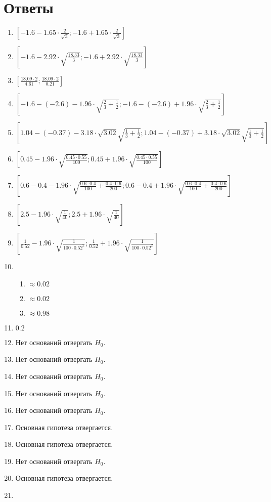 \documentclass[12pt]{article}
\begin{document}
\section{Ответы}


\begin{enumerate}
\item $\left[-1.6 - 1.65 \cdot \frac{2}{\sqrt{3}}; -1.6 + 1.65 \cdot \frac{2}{\sqrt{3}} \right]$
\item $\left[-1.6 - 2.92 \cdot \sqrt{\frac{18.33}{3}}; -1.6 + 2.92 \cdot \sqrt{\frac{18.33}{3}} \right]$
\item $\left[\frac{18.09 \cdot 2}{4.61}; \frac{18.09 \cdot 2}{0.21} \right]$
\item $\left[-1.6 - (-2.6) - 1.96 \cdot \sqrt{\frac{2}{3} + \frac{1}{2}}; -1.6 - (-2.6) + 1.96 \cdot \sqrt{\frac{2}{3} + \frac{1}{2}} \right]$
\item $\left[1.04 - (-0.37) - 3.18 \cdot \sqrt{3.02} \sqrt{\frac{1}{3} + \frac{1}{2}}; 1.04 - (-0.37) + 3.18 \cdot \sqrt{3.02} \sqrt{\frac{1}{3} + \frac{1}{2}} \right]$
\item $\left[0.45 - 1.96 \cdot \sqrt{\frac{0.45 \cdot 0.55}{100}}; 0.45 + 1.96 \cdot \sqrt{\frac{0.45 \cdot 0.55}{100}} \right]$
\item $\left[0.6 - 0.4 - 1.96  \cdot \sqrt{\frac{0.6\cdot0.4}{100} + \frac{0.4 \cdot 0.6}{200}}; 0.6 - 0.4 + 1.96 \cdot \sqrt{\frac{0.6\cdot0.4}{100} + \frac{0.4 \cdot 0.6}{200}} \right]$
\item $\left[2.5 - 1.96 \cdot \sqrt{\frac{1}{40}}; 2.5 + 1.96 \cdot \sqrt{\frac{1}{40}} \right]$
\item $\left[\frac{1}{0.52} - 1.96 \cdot \sqrt{\frac{1}{100 \cdot 0.52^2}}; \frac{1}{0.52} + 1.96 \cdot \sqrt{\frac{1}{100 \cdot 0.52^2}} \right]$
\item
\begin{enumerate}
\item $\approx 0.02$
\item $\approx 0.02$
\item $\approx 0.98$
\end{enumerate}
\item $0.2$
\item Нет оснований отвергать $H_0$.
\item Нет оснований отвергать $H_0$.
\item Нет оснований отвергать $H_0$.
\item Нет оснований отвергать $H_0$.
\item Нет оснований отвергать $H_0$.
\item Основная гипотеза отвергается.
\item Основная гипотеза отвергается.
\item Нет оснований отвергать $H_0$.
\item Основная гипотеза отвергается.
\item
\end{enumerate}
\end{document}
